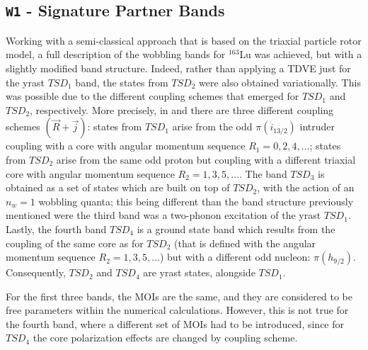 \documentclass[myclassdoc,debug]{rjparticle}
\begin{document}
\subsection{\texttt{W1} - Signature Partner Bands}
\label{subsection:w1}

Working with a semi-classical approach that is based on the triaxial particle rotor model, a full description of the wobbling bands for $^{163}$Lu was achieved, but with a slightly modified band structure. Indeed, rather than applying a TDVE just for the yrast $TSD_1$ band, the states from $TSD_2$ were also obtained variationally. This was possible due to the different coupling schemes that emerged for $TSD_1$ and $TSD_2$, respectively. More precisely, in \cite{raduta2020towards} and \cite{raduta2020approach} there are three different coupling schemes $(\vec{R}+\vec{j})$: states from $TSD_1$ arise from the odd $\pi(i_{13/2})$ intruder coupling with a core with angular momentum sequence $R_1=0,2,4,\dots$; states from $TSD_2$ arise from the same odd proton but coupling with a different triaxial core with angular momentum sequence $R_2=1,3,5,\dots$. The band $TSD_3$ is obtained as a set of states which are built on top of $TSD_2$, with the action of an $n_w=1$ wobbling quanta; this being different than the band structure previously mentioned were the third band was a two-phonon excitation of the yrast $TSD_1$. Lastly, the fourth band $TSD_4$ is a ground state band which results from the coupling of the same core as for $TSD_2$ (that is defined with the angular momentum sequence $R_2=1,3,5,\dots$) but with a different odd nucleon: $\pi(h_{9/2})$. Consequently, $TSD_2$ and $TSD_4$ are yrast states, alongside $TSD_1$.

For the first three bands, the MOIs are the same, and they are considered to be free parameters within the numerical calculations. However, this is not true for the fourth band, where a different set of MOIs had to be introduced, since for $TSD_4$ the core polarization effects are changed by coupling scheme.
\end{document}
